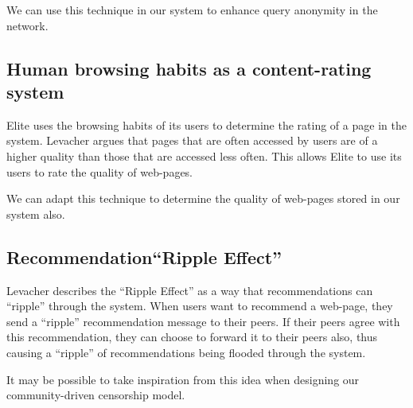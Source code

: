 We can use this technique in our system to enhance query anonymity in the network.

\subsection{Human browsing habits as a content-rating system}

Elite uses the browsing habits of its users to determine the rating of a page in the system. Levacher argues that
pages that are often accessed by users are of a higher quality than those that are accessed less often. This
allows Elite to use its users to rate the quality of web-pages.

We can adapt this technique to determine the quality of web-pages stored in our system also.

\subsection{Recommendation``Ripple Effect''}

Levacher describes the ``Ripple Effect'' as a way that recommendations can ``ripple'' through the system. When users
want to recommend a web-page, they send a ``ripple'' recommendation message to their peers. If their peers agree with
this recommendation, they can choose to forward it to their peers also, thus causing a ``ripple'' of recommendations
being flooded through the system.

It may be possible to take inspiration from this idea when designing our community-driven censorship model.
